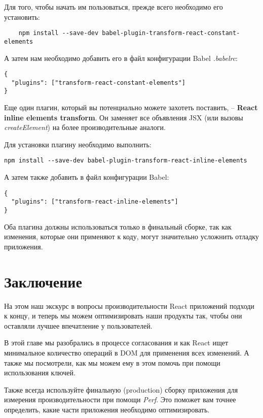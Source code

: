 Для того, чтобы начать им пользоваться, прежде всего необходимо его установить:

\begin{lstlisting}
	npm install --save-dev babel-plugin-transform-react-constant-elements
\end{lstlisting}

А затем нам необходимо добавить его в файл конфигурации Babel \textit{.babelrc}:

\begin{lstlisting}
{
  "plugins": ["transform-react-constant-elements"]
}
\end{lstlisting}

Еще один плагин, который вы потенциально можете захотеть поставить, -- \textbf{React inline elements transform}. Он заменяет все объявления JSX (или вызовы \textit{createElement}) на более производительные аналоги.

Для установки плагину необходимо выполнить:

\begin{lstlisting}
npm install --save-dev babel-plugin-transform-react-inline-elements
\end{lstlisting}

А затем также добавить в файл конфигурации Babel:

\begin{lstlisting}
{
  "plugins": ["transform-react-inline-elements"]
}
\end{lstlisting}

Оба плагина должны использоваться только в финальный сборке, так как изменения, которые они применяют к коду, могут значительно усложнить отладку приложения.

\section{Заключение}

На этом наш экскурс в вопросы производительности React приложений подходи к концу, и теперь мы можем оптимизировать наши продукты так, чтобы они оставляли лучшее впечатление у пользователей.

В этой главе мы разобрались в процессе согласования и как React ищет минимальное количество операций в DOM для применения всех изменений. А также мы посмотрели, как мы можем ему в этом помочь при помощи использования ключей.

Также всегда используйте финальную (production) сборку приложения для измерения производительности при помощи \textit{Perf}. Это поможет вам точнее определить, какие части приложения необходимо оптимизировать.

